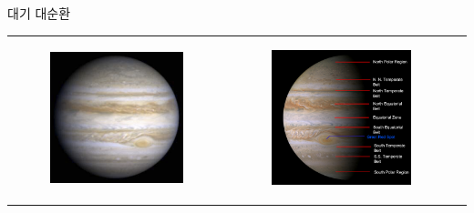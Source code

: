 \begin{frame}[t]{대기 대순환}
	\begin{tabular}{lll}
		\begin{minipage}[t]{0.3\textwidth}\scriptsize
			\begin{figure}[t]
				\includegraphics[width=0.98\textwidth]{./images/Jupiter1}
			\end{figure}
		\end{minipage}	
		&
		\begin{minipage}[t]{0.3\textwidth}\scriptsize
			\begin{figure}[t]
				\includegraphics[width=\textwidth]{./images/Jupiter2}

\end{figure}
\end{minipage}
\end{tabular}
\end{frame}
